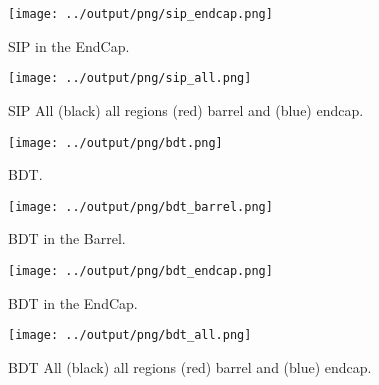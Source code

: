 \documentclass[11pt]{book}
\begin{document}
\begin{figure}[ht]
\centering
\texttt{[image: ../output/png/sip\_endcap.png]}
\caption{SIP in the EndCap.}
\label{fig:sip_endcap}
\end{figure}

\begin{figure}[htb]
\centering
\texttt{[image: ../output/png/sip\_all.png]}
\caption{SIP All (black) all regions (red) barrel and (blue) endcap.}
\label{fig:sip_all}
\end{figure}

\begin{figure}[htb]
\centering
\texttt{[image: ../output/png/bdt.png]}
\caption{BDT.}
\label{fig:bdt}
\end{figure}

\begin{figure}[htb]
\centering
\texttt{[image: ../output/png/bdt\_barrel.png]}
\caption{BDT in the Barrel.}
\label{fig:bdt_barrel}
\end{figure}

\begin{figure}[htb]
\centering
\texttt{[image: ../output/png/bdt\_endcap.png]}
\caption{BDT in the EndCap.}
\label{fig:bdt_endcap}
\end{figure}

\begin{figure}[htb]
\centering
\texttt{[image: ../output/png/bdt\_all.png]}
\caption{BDT All (black) all regions (red) barrel and (blue) endcap.}
\label{fig:bdt_all}
\end{figure}
\clearpage


\end{document}
